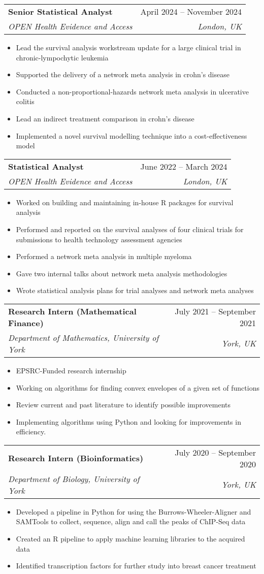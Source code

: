 \documentclass[letterpaper,11pt]{article}
\makeatletter
\newcommand{\resumeItem}[1]{
  \item\small{
    {#1 \vspace{-2pt}}
  }
}
\newcommand{\resumeSubheading}[4]{
  \vspace{-2pt}\item
    \begin{tabular*}{0.97\textwidth}[t]{l@{\extracolsep{\fill}}r}
      \textbf{#1} & #2 \\
      \textit{\small#3} & \textit{\small #4} \\
    \end{tabular*}\vspace{-7pt}
}
\newcommand{\resumeItemListStart}{\begin{itemize}}
\newcommand{\resumeItemListEnd}{\end{itemize}\vspace{-5pt}}
\makeatother
\begin{document}
    \resumeSubheading
    {Senior Statistical Analyst}{April 2024 -- November 2024}
    {OPEN Health Evidence and Access}{London, UK}
    \resumeItemListStart
      \resumeItem{Lead the survival analysis workstream update for a large clinical trial in chronic-lympochytic leukemia}
      \resumeItem{Supported the delivery of a network meta analysis in crohn's disease}
      \resumeItem{Conducted a non-proportional-hazards network meta analysis in ulcerative colitis}
      \resumeItem{Lead an indirect treatment comparison in crohn's disease}
      \resumeItem{Implemented a novel survival modelling technique into a cost-effectiveness model}
    \resumeItemListEnd

    \resumeSubheading
    {Statistical Analyst}{June 2022 -- March 2024}
    {OPEN Health Evidence and Access}{London, UK}
    \resumeItemListStart
      \resumeItem{Worked on building and maintaining in-house R packages for survival analysis}
        \resumeItem{Performed and reported on the survival analyses of four clinical trials for submissions to health technology assessment agencies}
        \resumeItem{Performed a network meta analysis in multiple myeloma}
        \resumeItem{Gave two internal talks about network meta analysis methodologies}
        \resumeItem{Wrote statistical analysis plans for trial analyses and network meta analyses}
    \resumeItemListEnd
    
    \resumeSubheading
    {Research Intern (Mathematical Finance)}{July 2021 -- September 2021}
    {Department of Mathematics, University of York}{York, UK}
    \resumeItemListStart
        \resumeItem{EPSRC-Funded research internship}
        \resumeItem{Working on algorithms for finding convex envelopes of a given set of functions}
        \resumeItem{Review current and past literature to identify possible improvements}
        \resumeItem{Implementing algorithms using Python and looking for improvements in efficiency.}
    \resumeItemListEnd
    
    \resumeSubheading
    {Research Intern (Bioinformatics)}{July 2020 -- September 2020}
      {Department of Biology, University of York}{York, UK}
      \resumeItemListStart
        \resumeItem{Developed a pipeline in Python for using the Burrows-Wheeler-Aligner and SAMTools to collect, sequence, align and call the peaks of ChIP-Seq data}
        \resumeItem{Created an R pipeline to apply machine learning libraries to the acquired data}
        \resumeItem{Identified transcription factors for further study into breast cancer treatment}
      \resumeItemListEnd
\end{document}
